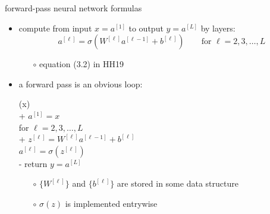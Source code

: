 \documentclass[xcolor={svgnames},
               hyperref={colorlinks,citecolor=DeepPink4,linkcolor=FireBrick,urlcolor=Maroon}]
               {beamer}
\begin{document}
\begin{frame}{forward-pass neural network formulas}

\begin{itemize}
\item compute from input $x = a^{[1]}$ to output $y = a^{[L]}$ by layers:
    $$a^{[\ell]} = \sigma\left(W^{[\ell]} a^{[\ell-1]} + b^{[\ell]}\right) \qquad \text{for } \ell=2,3,\dots,L$$

    \begin{itemize}
    \item[$\circ$] equation (3.2) in HH19
    \end{itemize}
\item a forward pass is an obvious loop:

\begin{pseudo*}
(x)\text{:} \\+
    $a^{[1]} = x$ \\
    for $\ell = 2,3,\dots,L$ \\+
        $z^{[\ell]} = W^{[\ell]} a^{[\ell-1]} + b^{[\ell]}$ \\
        $a^{[\ell]} = \sigma\left(z^{[\ell]}\right)$ \\-
    return $y=a^{[L]}$
\end{pseudo*}

    \begin{itemize}
    \item[$\circ$] $\{W^{[\ell]}\}$ and $\{b^{[\ell]}\}$ are stored in some data structure
    \item[$\circ$] $\sigma(z)$ is implemented entrywise
    \end{itemize}
\end{itemize}
\end{frame}
\end{document}
